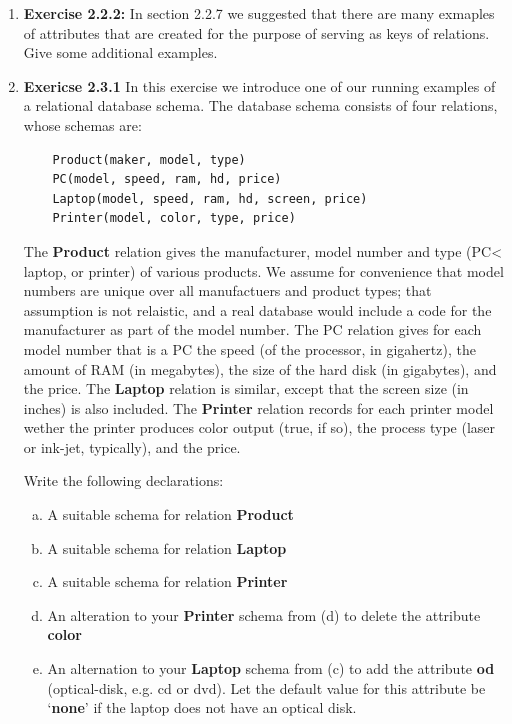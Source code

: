 \documentclass[12pt]{article}
\begin{document}
\begin{enumerate}[1.]
    \item \textbf{Exercise 2.2.2:} In section 2.2.7 we suggested that there are many
    exmaples of attributes that are created for the purpose of serving as keys of
    relations. Give some additional examples.


    \item \textbf{Exericse 2.3.1} In this exercise we introduce one of our running
    examples of a relational database schema. The database schema consists of four relations,
    whose schemas are:

    \bigskip

    \begin{lstlisting}
    Product(maker, model, type)
    PC(model, speed, ram, hd, price)
    Laptop(model, speed, ram, hd, screen, price)
    Printer(model, color, type, price)
    \end{lstlisting}

    The \textbf{Product} relation gives the manufacturer, model number and type
    (PC< laptop, or printer) of various products. We assume for convenience that
    model numbers are unique over all manufactuers and product types; that assumption is
    not relaistic, and a real database would include a code for the manufacturer
    as part of the model number. The PC relation gives for each model number that
    is a PC the speed (of the processor, in gigahertz), the amount of RAM (in megabytes),
    the size of the hard disk (in gigabytes), and the price. The \textbf{Laptop}
    relation is similar, except that the screen size (in inches) is also included. The
    \textbf{Printer} relation records for each printer model wether the printer
    produces color output (true, if so), the process type (laser or ink-jet, typically),
    and the price.

    \bigskip

    Write the following declarations:

    \begin{enumerate}[a)]
        \item A suitable schema for relation \textbf{Product}
        \item A suitable schema for relation \textbf{Laptop}
        \item A suitable schema for relation \textbf{Printer}
        \item An alteration to your \textbf{Printer} schema from (d) to delete
        the attribute \textbf{color}
        \item An alternation to your \textbf{Laptop} schema from (c) to add the
        attribute \textbf{od} (optical-disk, e.g. cd or dvd). Let the default value
        for this attribute be `\textbf{none}' if the laptop does not have an optical
        disk.
    \end{enumerate}


\end{enumerate}
\end{document}
